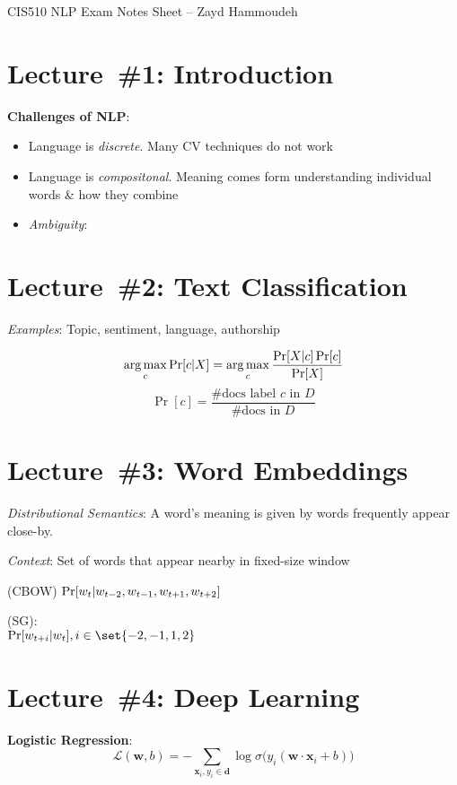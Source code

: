 \documentclass[9pt]{extarticle}
\begin{document}
\begin{center}
CIS510 NLP Exam Notes Sheet -- Zayd Hammoudeh
\end{center}
\begin{multicols}{3}
  \section*{Lecture~\#1: Introduction}

  \textbf{Challenges of NLP}:
  \begin{itemize}
    \item Language is \textit{discrete}. Many CV techniques do not work
    \item Language is \textit{compositonal}. Meaning comes form understanding individual words \& how they combine
    \item \textit{Ambiguity}:
  \end{itemize}

  \section*{Lecture~\#2: Text Classification}
  \textit{Examples}: Topic, sentiment, language, authorship

  \begin{equation*}\label{eq:L02:NaiveBayes}
    \operatorname*{arg\,max}_c \Pr\lbrack c \vert X\rbrack = \operatorname*{arg\,max}_{c} \frac{\Pr[X \vert c] \Pr[c]}{\Pr[X]}
  \end{equation*}
  \begin{equation*}\label{eq:L02:Bernoulli}
    \Pr[c] = \frac{\text{\#docs label } c \text{ in } D}{\text{\#docs in } D}
  \end{equation*}

  \section*{Lecture~\#3: Word Embeddings}
  \textit{Distributional Semantics}: A word's meaning is given by words frequently appear close-by.

  \textit{Context}: Set of words that appear nearby in fixed-size window

  \textbf{} (CBOW) ${\Pr\lbrack w_t \vert w_{t-2}, w_{t-1}, w_{t+1}, w_{t+2}\rbrack}$

  \textbf{} (SG): \\ ${\Pr\sbrack{w_{t+i} \vert w_{t}}, i \in \set{-2,-1,1,2}}$

  \section*{Lecture~\#4: Deep Learning}
  \textbf{Logistic Regression}:
  \begin{equation*}\label{eq:L04:LogReg}
    \mathcal{L}(\mathbf{w},b) = -\sum_{\mathbf{x}_i,y_i \in \mathbf{d}} \log \sigma\big( y_i(\mathbf{w}\cdot \mathbf{x}_i + b) \big)
  \end{equation*}

\end{multicols}
\end{document}
